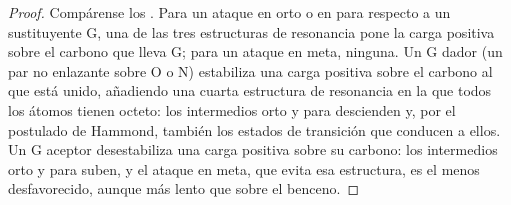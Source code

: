 \begin{proof}
Compárense los . Para un ataque en orto o en para respecto a un sustituyente G, una de las
tres estructuras de resonancia pone la carga positiva sobre el carbono que lleva G; para un ataque en meta,
ninguna. Un G dador (un par no enlazante sobre O o N) estabiliza una carga positiva sobre el carbono al que
está unido, añadiendo una cuarta estructura de resonancia en la que todos los átomos tienen octeto: los intermedios orto
y para descienden y, por el postulado de Hammond, también los estados de transición
que conducen a ellos. Un G aceptor desestabiliza una carga positiva sobre su carbono: los intermedios orto y para
suben, y el ataque en meta, que evita esa estructura, es el menos
desfavorecido, aunque más lento que sobre el benceno.
\end{proof}


